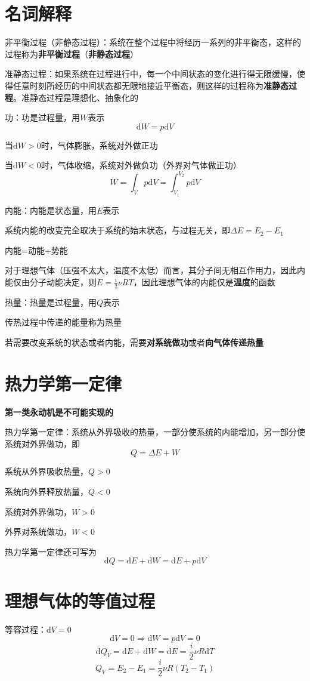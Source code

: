 \documentclass[12pt, a4paper, twoside]{ctexbook}
\begin{document}
\section{名词解释}
{\sonti 非平衡过程（非静态过程）}：系统在整个过程中将经历一系列的非平衡态，这样的过程称为\textbf{非平衡过程}{\sonti （}\textbf{非静态过程}{\sonti ）}

{\sonti 准静态过程}：如果系统在过程进行中，每一个中间状态的变化进行得无限缓慢，使得任意时刻所经历的中间状态都无限地接近平衡态，则这样的过程称为\textbf{准静态过程}。准静态过程是理想化、抽象化的

{\sonti 功}：功是过程量，用$W$表示
$$
\mathrm{d}W=p\mathrm{d}V
$$

当$\mathrm{d}W>0$时，气体膨胀，系统对外做正功

当$\mathrm{d}W<0$时，气体收缩，系统对外做负功（外界对气体做正功）
$$
W=\int_V p\mathrm{d}V=\int_{V_1}^{V_2} p\mathrm{d}V
$$

{\sonti 内能}：内能是状态量，用$E$表示

系统内能的改变完全取决于系统的始末状态，与过程无关，即$\Delta E=E_2-E_1$

内能=动能+势能

对于理想气体（压强不太大，温度不太低）而言，其分子间无相互作用力，因此内能仅由分子动能决定，则$E=\frac{i}{2}\nu RT$，因此理想气体的内能仅是\textbf{温度}的函数

{\sonti 热量}：热量是过程量，用$Q$表示

传热过程中传递的能量称为热量

若需要改变系统的状态或者内能，需要\textbf{对系统做功}或者\textbf{向气体传递热量}
\section{热力学第一定律}
\textbf{第一类永动机是不可能实现的}

{\sonti 热力学第一定律}：系统从外界吸收的热量，一部分使系统的内能增加，另一部分使系统对外界做功，即
$$
Q=\Delta E+W
$$

系统从外界吸收热量，$Q>0$

系统向外界释放热量，$Q<0$

系统对外界做功，$W>0$

外界对系统做功，$W<0$

热力学第一定律还可写为
$$
\mathrm{d}Q=\mathrm{d}E+\mathrm{d}W=\mathrm{d}E+p\mathrm{d}V
$$

\section{理想气体的等值过程}
{\sonti 等容过程}：$\mathrm{d}V=0$
$$
\mathrm{d}V=0 \Rightarrow \mathrm{d}W=p\mathrm{d}V=0
$$
$$
\mathrm{d}Q_V=\mathrm{d}E+\mathrm{d}W=\mathrm{d}E=\frac{i}{2}\nu R\mathrm{d}T
$$
$$
Q_V=E_2-E_1=\frac{i}{2}\nu R(T_2-T_1)
$$
\end{document}
